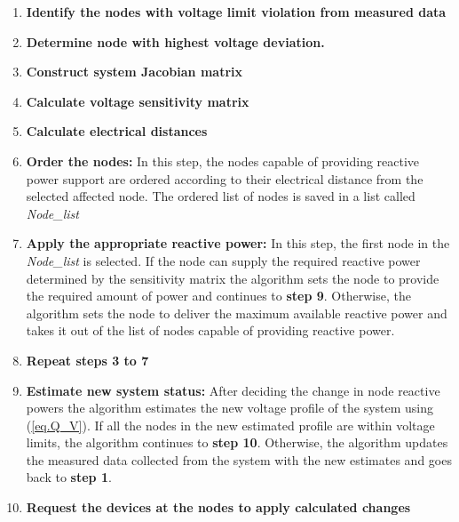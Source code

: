 \begin{enumerate}
\item \textbf{Identify the nodes with voltage limit violation from measured data}
\item \textbf{Determine node with highest voltage deviation.}
\item \textbf{Construct system Jacobian matrix}
\item \textbf{Calculate voltage sensitivity matrix}
\item \textbf{Calculate electrical distances}
\item \textbf{Order the nodes:} In this step, the nodes capable of providing reactive power support are ordered according to their electrical distance from the selected affected node. The ordered list of nodes is saved in a list called \textit{Node\_list}
\item \textbf{Apply the appropriate reactive power:} In this step, the first node in the \textit{Node\_list} is selected. If the node can supply the required reactive power determined by the sensitivity matrix the algorithm sets the node to provide the required amount of power and continues to \textbf{step 9}. Otherwise, the algorithm sets the node to deliver the maximum available reactive power and takes it out of the list of nodes capable of providing reactive power.
\item \textbf{Repeat steps 3 to 7}
\item \textbf{Estimate new system status:} After deciding the change in node reactive powers the algorithm estimates the new voltage profile of the system using (\ref{eq.Q_V}). If all the nodes in the new estimated profile are within voltage limits, the algorithm continues to \textbf{step 10}. Otherwise, the algorithm updates the measured data collected from the system with the new estimates and goes back to  \textbf{step 1}.

\item \textbf{Request the devices at the nodes to apply calculated changes}
\end{enumerate}



